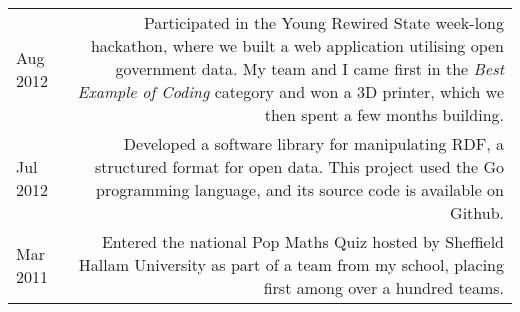 \begin{longtable}{L!{\sep}R}
    Aug 2012 &
    Participated in the Young Rewired State week-long hackathon, where we built a web application utilising open government data. My team and I came first in the \emph{Best Example of Coding} category and won a 3D printer, which we then spent a few months building.
    \vspace{1.2em} \\

    Jul 2012 &
    Developed a software library for manipulating RDF, a structured format for open data. This project used the Go programming language, and its source code is available on Github.
    \vspace{1.2em} \\

    Mar 2011 &
    Entered the national Pop Maths Quiz hosted by Sheffield Hallam University as part of a team from my school, placing first among over a hundred teams.
    \\
\end{longtable}

\vspace{.2em}
